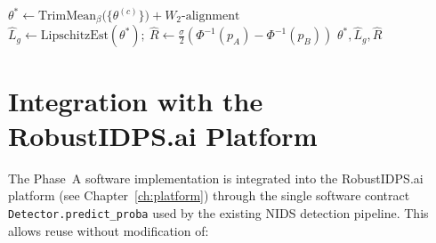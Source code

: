 \begin{algorithm}[H]
\caption{Unified training procedure for a single federated round
(UAV-specific instantiation of Algorithm~\ref{alg:unified}).}
\label{alg:uav_unified_round}
$\theta^{*}\leftarrow \mathrm{TrimMean}_{\beta}\bigl(\{\theta^{(c)}\}\bigr)
  + W_2\text{-alignment}$
$\hat L_g \leftarrow \mathrm{LipschitzEst}(\theta^{*});\
  \hat R \leftarrow \tfrac{\sigma}{2}(\Phi^{-1}(p_A)-\Phi^{-1}(p_B))$\;
\Return $\theta^{*},\hat L_g,\hat R$\;
\end{algorithm}

\section{Integration with the \textsf{RobustIDPS.ai} Platform}
\label{sec:uav_robustidps_integration}

The Phase~A software implementation is integrated into the
\textsf{RobustIDPS.ai} platform (see Chapter~\ref{ch:platform})
through the single software contract
\texttt{Detector.predict\_proba} used by the existing NIDS detection
pipeline. This allows reuse without modification of:

